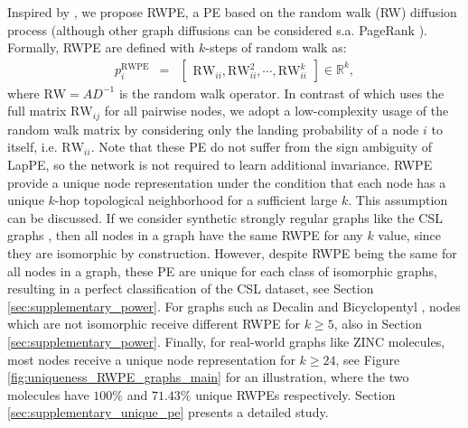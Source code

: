 \documentclass{article} \usepackage{iclr2021_conference,times}
\begin{document}
Inspired by \cite{li2020distance}, we propose RWPE, a PE based on the random walk (RW) diffusion process (although other graph diffusions can be considered s.a. PageRank \citep{mialon2021graphit}). Formally, RWPE are defined with $k$-steps of random walk as:
\begin{eqnarray}
p^\textrm{RWPE}_i &=& \left[ \begin{array}{c} \textrm{RW}_{ii}, \textrm{RW}_{ii}^2, \cdots, \textrm{RW}_{ii}^k \end{array} \right]\in\mathbb{R}^{k}, \label{eqn:init_pe_2} 
\end{eqnarray}
where $\textrm{RW} = AD^{-1}$ is the random walk operator. In contrast of \cite{li2020distance} which uses the full matrix $\text{RW}_{ij}$ for all pairwise nodes, we adopt a low-complexity usage of the random walk matrix by considering only the landing probability of a node $i$ to itself, i.e. $\text{RW}_{ii}$. Note that these PE do not suffer from the sign ambiguity of LapPE, so the network is not required to learn additional invariance.
RWPE provide a unique node representation under the condition that each node has a unique $k$-hop topological neighborhood for a sufficient large $k$. This assumption can be discussed. If we consider synthetic strongly regular graphs like the CSL graphs \citep{murphy2019relational}, then all nodes in a graph have the same RWPE for any $k$ value, since they are isomorphic by construction. However, despite RWPE being the same for all nodes in a graph, these PE are unique for each class of isomorphic graphs,  resulting in a perfect classification of the CSL dataset, see Section \ref{sec:supplementary_power}.
For graphs such as Decalin and Bicyclopentyl \citep{sato2020survey}, nodes which are not isomorphic receive different RWPE for $k\geq 5$, also in Section \ref{sec:supplementary_power}. Finally, for real-world graphs like ZINC molecules, most nodes receive a unique node representation for $k\geq 24$, see Figure \ref{fig:uniqueness_RWPE_graphs_main} for an illustration, where the two molecules have $100\%$ and $71.43\%$ unique RWPEs respectively. Section \ref{sec:supplementary_unique_pe} presents a detailed study.
\end{document}
